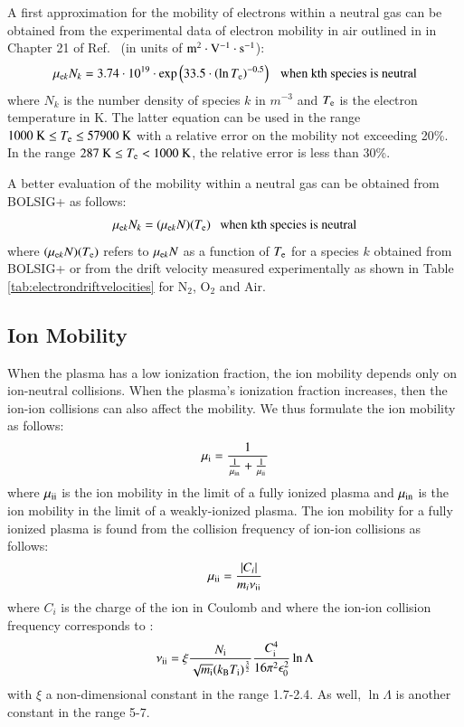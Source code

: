 \documentclass{warpdoc}
\begin{document}
A first approximation for the mobility of electrons within a neutral gas can be obtained from the experimental data of electron mobility in air outlined in in Chapter 21 of Ref.\ \cite{book:1997:grigoriev} (in units of $\rm m^2\cdot V^{-1}\cdot s^{-1}$):
%
\begin{equation}
\mu_{{\rm e}k} N_k= 3.74\cdot 10^{19} \cdot {\rm exp}\left(33.5 \cdot \left({\rm ln}\, T_{\rm e} \right)^{-0.5}\right) {\rm ~~~when~kth~species~is~neutral}
\end{equation}
%
where $N_k$ is the number density of species $k$ in $m^{-3}$ and $T_{\rm e}$ is the electron temperature in K.
The latter equation can be used in the range $1000~{\rm K} \le T_{\rm e} \le 57900 ~{\rm K}$ with a relative error on the mobility not exceeding 20\%. In the range $287~{\rm K} \le T_{\rm e} < 1000~{\rm K}$, the relative error is less than 30\%. 

A better evaluation of the mobility within a neutral gas can be obtained from BOLSIG+ as follows:
%
\begin{equation}
\mu_{{\rm e}k} N_k = (\mu_{{\rm e}k} N)(T_{\rm e}) {\rm ~~~when~kth~species~is~neutral}
\end{equation}
%
where $(\mu_{{\rm e}k} N)(T_{\rm e})$ refers to $\mu_{{\rm e}k} N$ as a function of $T_{\rm e}$ for a species $k$ obtained from BOLSIG+ or from the drift velocity measured experimentally as shown in Table \ref{tab:electrondriftvelocities} for N$_2$, O$_2$ and Air.


\subsection{Ion Mobility}

When the plasma has a low ionization fraction, the ion mobility depends only on ion-neutral collisions. When the plasma's ionization fraction increases, then the ion-ion collisions can also affect the mobility. We thus formulate the ion mobility as follows:
%
\begin{equation}
\mu_{\rm i}=\frac{1}{\frac{1}{\mu_{\rm in}}+\frac{1}{\mu_{\rm ii}}}
\end{equation}
%
where $\mu_{\rm ii}$ is the ion mobility in the limit of a fully ionized plasma and $\mu_{\rm in}$ is the ion mobility in the limit of a weakly-ionized plasma. The ion mobility for a fully ionized plasma is found from the collision frequency of ion-ion collisions as follows:
%
\begin{equation}
 \mu_{\rm ii} = \frac{|C_i|}{m_i \nu_{\rm ii}}
\end{equation}
% 
where $C_i$ is the charge of the ion in Coulomb and where the ion-ion collision frequency corresponds to \cite{book:1984:chen}:
%
\begin{equation}
\nu_{\rm ii}=\xi \frac{ N_{\rm i}}{ \sqrt{m_{\rm i}} (k_{\rm B} T_{\rm i})^\frac{3}{2}}  \frac{C_{\rm i}^4}{16 \pi^2 \epsilon_0^2}  \ln \Lambda
\end{equation}
%
with $\xi$ a non-dimensional constant in the range 1.7-2.4. As well, $\ln \Lambda$ is another constant in the range 5-7.
\end{document}
